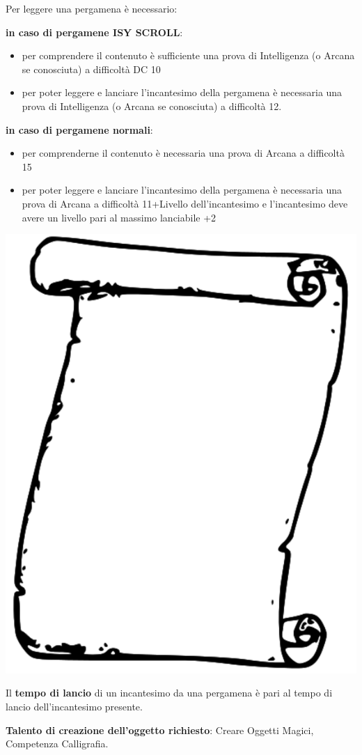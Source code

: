 \begin{multicols}{2}
\medskip

Per leggere una pergamena è necessario:\label{leggerepergamena}

\medskip

\textbf{in caso di pergamene ISY SCROLL}:

\begin{itemize}[leftmargin=*] \setlength{\itemsep}{0pt}
\item per comprendere il contenuto è sufficiente una prova di Intelligenza (o Arcana se conosciuta) a difficoltà DC 10
\item per poter leggere e lanciare l'incantesimo della pergamena è necessaria una prova di Intelligenza (o Arcana se conosciuta) a difficoltà 12.
\end{itemize}

\textbf{in caso di pergamene normali}:

\begin{itemize}[leftmargin=*] \setlength{\itemsep}{0pt}
\item per comprenderne il contenuto è necessaria una prova di Arcana a difficoltà 15
\item per poter leggere e lanciare l'incantesimo della pergamena è necessaria una prova di Arcana a difficoltà 11+Livello dell'incantesimo e l'incantesimo deve avere un livello pari al massimo lanciabile +2
\end{itemize}

\begin{center}
\includegraphics[width=0.4\linewidth]{immagini/scroll3.png}
\end{center}

Il \textbf{tempo di lancio} di un incantesimo da una pergamena è pari al tempo di lancio dell'incantesimo presente.

\textbf{Talento di creazione dell'oggetto richiesto}: Creare Oggetti Magici, Competenza Calligrafia.


\end{multicols}
